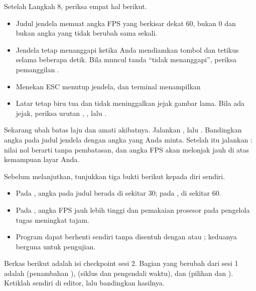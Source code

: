 \begin{ujibox}
Setelah Langkah 8, periksa empat hal berikut.
\begin{itemize}[leftmargin=1.4em, itemsep=0.2em]
  \item Judul jendela memuat angka FPS yang berkisar dekat 60, bukan 0 dan
        bukan angka yang tidak berubah sama sekali.
  \item Jendela tetap menanggapi ketika Anda mendiamkan tombol dan tetikus
        selama beberapa detik. Bila muncul tanda ``tidak menanggapi'',
        periksa pemanggilan .
  \item Menekan ESC menutup jendela, dan terminal menampilkan
  \item Latar tetap biru tua dan tidak meninggalkan jejak gambar lama. Bila
        ada jejak, periksa urutan , , lalu .
\end{itemize}
\end{ujibox}

Sekarang ubah batas laju dan amati akibatnya. Jalankan
, lalu . Bandingkan
angka pada judul jendela dengan angka yang Anda minta. Setelah itu jalankan
: nilai nol berarti tanpa pembatasan, dan angka
FPS akan melonjak jauh di atas kemampuan layar Anda.

\begin{ujibox}
Sebelum melanjutkan, tunjukkan tiga bukti berikut kepada diri sendiri.
\begin{itemize}[leftmargin=1.4em, itemsep=0.2em]
  \item Pada , angka pada judul berada di sekitar 30; pada
        , di sekitar 60.
  \item Pada , angka FPS jauh lebih tinggi dan pemakaian
        prosesor pada pengelola tugas meningkat tajam.
  \item Program dapat berhenti sendiri tanpa disentuh dengan
         atau ; keduanya
        berguna untuk pengujian.
\end{itemize}
\end{ujibox}


Berkas berikut adalah isi checkpoint sesi 2. Bagian yang berubah dari sesi 1
adalah  (penambahan ),  (siklus dan
pengendali waktu), dan  (pilihan  dan
). Ketiklah sendiri di editor, lalu bandingkan hasilnya.

